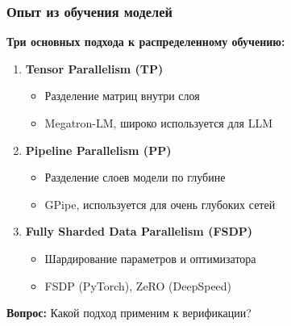 \begin{frame}
\frametitle{Опыт из обучения моделей}

\textbf{Три основных подхода к распределенному обучению:}

\vspace{0.3cm}

\begin{enumerate}
    \item \textbf{Tensor Parallelism (TP)}
    \begin{itemize}
        \item Разделение матриц внутри слоя
        \item Megatron-LM, широко используется для LLM
    \end{itemize}

    \item \textbf{Pipeline Parallelism (PP)}
    \begin{itemize}
        \item Разделение слоев модели по глубине
        \item GPipe, используется для очень глубоких сетей
    \end{itemize}

    \item \textbf{Fully Sharded Data Parallelism (FSDP)}
    \begin{itemize}
        \item Шардирование параметров и оптимизатора
        \item FSDP (PyTorch), ZeRO (DeepSpeed)
    \end{itemize}
\end{enumerate}

\vspace{0.3cm}

\textbf{Вопрос:} Какой подход применим к верификации?

\end{frame}

